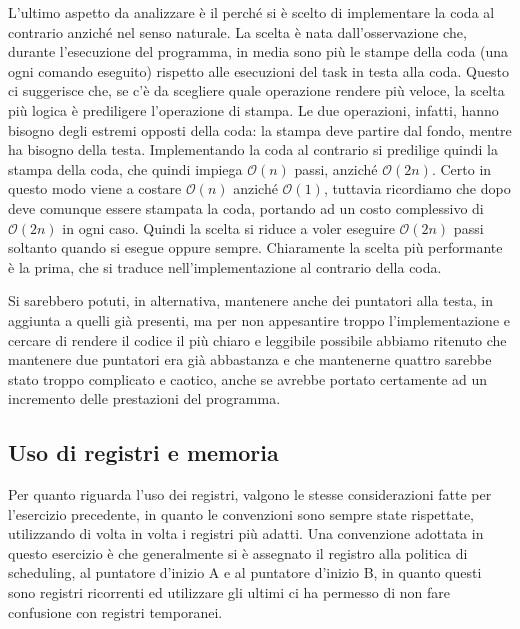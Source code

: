         L'ultimo aspetto da analizzare è il perché si è scelto di implementare la coda al contrario anziché nel senso naturale. La scelta è nata dall'osservazione che, durante l'esecuzione del programma, in media sono più le stampe della coda (una ogni comando eseguito) rispetto alle esecuzioni del task in testa alla coda. Questo ci suggerisce che, se c'è da scegliere quale operazione rendere più veloce, la scelta più logica è prediligere l'operazione di stampa. Le due operazioni, infatti, hanno bisogno degli estremi opposti della coda: la stampa deve partire dal fondo, mentre  ha bisogno della testa. Implementando la coda al contrario si predilige quindi la stampa della coda, che quindi impiega $\mathcal{O}(n)$ passi, anziché $\mathcal{O}(2n)$. Certo in questo modo  viene a costare $\mathcal{O}(n)$ anziché $\mathcal{O}(1)$, tuttavia ricordiamo che dopo  deve comunque essere stampata la coda, portando ad un costo complessivo di $\mathcal{O}(2n)$ in ogni caso. Quindi la scelta si riduce a voler eseguire $\mathcal{O}(2n)$ passi soltanto quando si esegue  oppure sempre. Chiaramente la scelta più performante è la prima, che si traduce nell'implementazione al contrario della coda.
        
        Si sarebbero potuti, in alternativa, mantenere anche dei puntatori alla testa, in aggiunta a quelli già presenti, ma per non appesantire troppo l'implementazione e cercare di rendere il codice il più chiaro e leggibile possibile abbiamo ritenuto che mantenere due puntatori era già abbastanza e che mantenerne quattro sarebbe stato troppo complicato e caotico, anche se avrebbe portato certamente ad un incremento delle prestazioni del programma.
    
    \subsection*{Uso di registri e memoria}
    
        Per quanto riguarda l'uso dei registri, valgono le stesse considerazioni fatte per l'esercizio precedente, in quanto le convenzioni sono sempre state rispettate, utilizzando di volta in volta i registri più adatti. Una convenzione adottata in questo esercizio è che generalmente si è assegnato il registro  alla politica di scheduling,  al puntatore d'inizio A e  al puntatore d'inizio B, in quanto questi sono registri ricorrenti ed utilizzare gli ultimi ci ha permesso di non fare confusione con registri temporanei.
        
